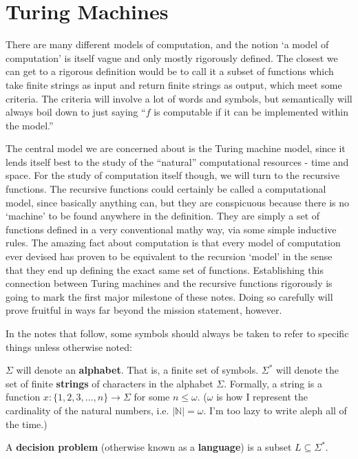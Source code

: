 \section{Turing Machines}
There are many different models of computation, and the notion `a model of computation' is itself vague and only mostly rigorously defined. The closest we can get to a rigorous definition would be to call it a subset of functions which take finite strings as input and return finite strings as output, which meet some criteria. The criteria will involve a lot of words and symbols, but semantically will always boil down to just saying ``$f$ is computable if it can be implemented within the model.'' 

The central model we are concerned about is the Turing machine model, since it lends itself best to the study of the ``natural'' computational resources - time and space. For the study of computation itself though, we will turn to the recursive functions. The recursive functions could certainly be called a computational model, since basically anything can, but they are conspicuous because there is no `machine' to be found anywhere in the definition. They are simply a set of functions defined in a very conventional mathy way, via some simple inductive rules. The amazing fact about computation is that every model of computation ever devised has proven to be equivalent to the recursion `model' in the sense that they end up defining the exact same set of functions. Establishing this connection between Turing machines and the recursive functions rigorously is going to mark the first major milestone of these notes. Doing so carefully will prove fruitful in ways far beyond the mission statement, however.

In the notes that follow, some symbols should always be taken to refer to specific things unless otherwise noted:

$\Sigma$ will denote an \textbf{alphabet}. That is, a finite set of symbols. 
$\Sigma^*$ will denote the set of finite \textbf{strings} of characters in the alphabet $\Sigma$. Formally, a string is a function $x: \{1,2,3,\ldots,n\}\to \Sigma$ for some $n \leq \omega$. ($\omega$ is how I represent the cardinality of the natural numbers, i.e. $|\mathbb{N}| = \omega$. I'm too lazy to write aleph all of the time.)

\begin{definition}
A \textbf{decision problem} (otherwise known as a \textbf{language}) is a subset $L \subseteq \Sigma^*$.
\end{definition}

